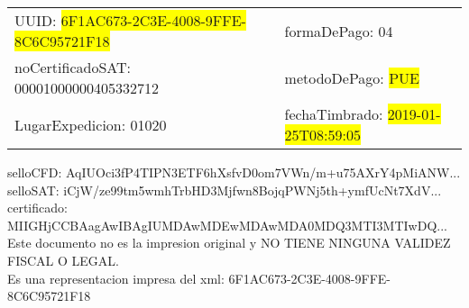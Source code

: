 \documentclass{article}
\begin{document}
\begin{tabular}{p{11cm}p{1cm}p{8cm}}
\bigskip
UUID: \colorbox{yellow}{ 6F1AC673-2C3E-4008-9FFE-8C6C95721F18 } & & formaDePago: 04\\

noCertificadoSAT: 00001000000405332712 & & metodoDePago: \colorbox{yellow}{ PUE }\\

LugarExpedicion: 01020 & & fechaTimbrado: \colorbox{yellow}{ 2019-01-25T08:59:05 } \\
\end{tabular}

\bigskip
selloCFD: AqIUOci3fP4TIPN3ETF6hXsfvD0om7VWn/m+u75AXrY4pMiANW... \\
selloSAT: iCjW/ze99tm5wmhTrbHD3Mjfwn8BojqPWNj5th+ymfUcNt7XdV... \\

certificado: MIIGHjCCBAagAwIBAgIUMDAwMDEwMDAwMDA0MDQ3MTI3MTIwDQ...\bigskip\bigskip\bigskip\bigskip\bigskip\bigskip
\\Este documento no es la impresion original y NO TIENE NINGUNA VALIDEZ FISCAL O LEGAL. \\
 Es una representacion impresa del xml:  6F1AC673-2C3E-4008-9FFE-8C6C95721F18 \\
\end{document}
